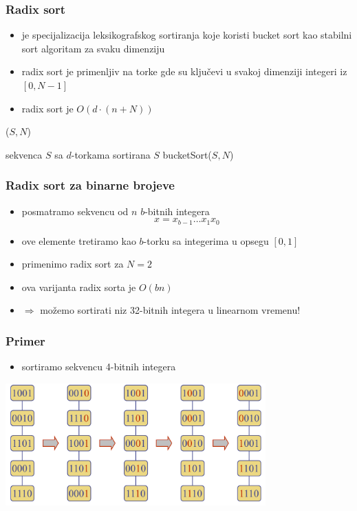 \documentclass[compress,aspectratio=169]{beamer}
\begin{document}
\begin{frame}
  \frametitle{Radix sort}
  \begin{itemize}
    \item {} je specijalizacija leksikografskog sortiranja koje koristi bucket sort kao stabilni sort algoritam za svaku dimenziju
    \item radix sort je primenljiv na torke gde su ključevi u svakoj dimenziji integeri iz $[0,N-1]$
    \item radix sort je $O(d\cdot (n+N))$
  \end{itemize}
($S, N$)
\begin{algorithmic}
\REQUIRE sekvenca $S$ sa $d$-torkama
\ENSURE sortirana $S$
  \STATE bucketSort($S, N$)
\ENDFOR
\end{algorithmic}
\end{frame}

\begin{frame}
  \frametitle{Radix sort za binarne brojeve}
  \begin{itemize}
    \item posmatramo sekvencu od $n$ $b$-bitnih integera
    $$x = x_{b-1} \ldots x_1 x_0$$
    \item ove elemente tretiramo kao $b$-torku sa integerima u opsegu $[0,1]$
    \item primenimo radix sort za $N=2$
    \item ova varijanta radix sorta je $O(bn)$
    \item $\Rightarrow$ možemo sortirati niz 32-bitnih integera u linearnom vremenu!
  \end{itemize}
\end{frame}

\begin{frame}
  \frametitle{Primer}
  \begin{itemize}
    \item sortiramo sekvencu 4-bitnih integera
  \end{itemize}
  \begin{center}
    \includegraphics[width=10cm]{asp-12-pic34.png}
  \end{center}
\end{frame}
\end{document}
